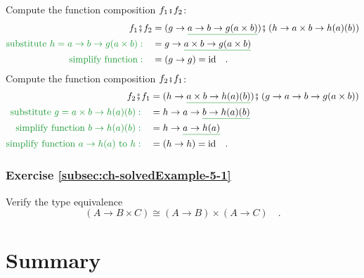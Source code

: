 Compute the function composition $f_{1}\bef f_{2}$:
\begin{align*}
f_{1}\bef f_{2} & =(g\rightarrow\gunderline{a\rightarrow b\rightarrow g(a\times b)})\bef\left(h\rightarrow a\times b\rightarrow h(a)(b)\right)\\
{\color{greenunder}\text{substitute }h=a\rightarrow b\rightarrow g(a\times b):}\quad & =g\rightarrow\gunderline{a\times b\rightarrow g(a\times b)}\\
{\color{greenunder}\text{simplify function}:}\quad & =\left(g\rightarrow g\right)=\text{id}\quad.
\end{align*}
Compute the function composition $f_{2}\bef f_{1}$:
\begin{align*}
f_{2}\bef f_{1} & =(h\rightarrow\gunderline{a\times b\rightarrow h(a)(b)})\bef\left(g\rightarrow a\rightarrow b\rightarrow g(a\times b)\right)\\
{\color{greenunder}\text{substitute }g=a\times b\rightarrow h(a)(b):}\quad & =h\rightarrow a\rightarrow\gunderline{b\rightarrow h(a)(b)}\\
{\color{greenunder}\text{simplify function }b\rightarrow h(a)(b):}\quad & =h\rightarrow\gunderline{a\rightarrow h(a)}\\
{\color{greenunder}\text{simplify function }a\rightarrow h(a)\text{ to }h:}\quad & =\left(h\rightarrow h\right)=\text{id}\quad.
\end{align*}


\subsubsection{Exercise \label{subsec:ch-solvedExample-5-1}\ref{subsec:ch-solvedExample-5-1}}

Verify the type equivalence
\[
\left(A\rightarrow B\times C\right)\cong\left(A\rightarrow B\right)\times\left(A\rightarrow C\right)\quad.
\]


\section{Summary}

